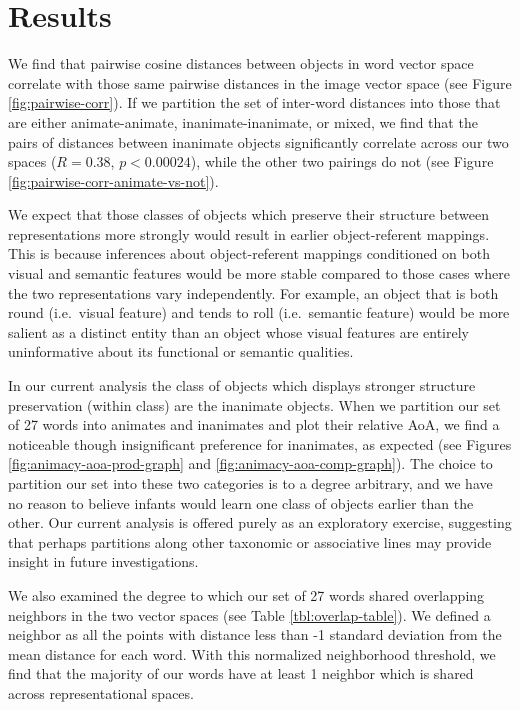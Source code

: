\documentclass[10pt, letterpaper]{article}
\begin{document}
\section{Results}\label{results}

We find that pairwise cosine distances between objects in word vector
space correlate with those same pairwise distances in the image vector
space (see Figure \ref{fig:pairwise-corr}). If we partition the set of
inter-word distances into those that are either animate-animate,
inanimate-inanimate, or mixed, we find that the pairs of distances
between inanimate objects significantly correlate across our two spaces
(\(R = 0.38\), \(p < 0.00024\)), while the other two pairings do not
(see Figure \ref{fig:pairwise-corr-animate-vs-not}).

We expect that those classes of objects which preserve their structure
between representations more strongly would result in earlier
object-referent mappings. This is because inferences about
object-referent mappings conditioned on both visual and semantic
features would be more stable compared to those cases where the two
representations vary independently. For example, an object that is both
round (i.e.~visual feature) and tends to roll (i.e.~semantic feature)
would be more salient as a distinct entity than an object whose visual
features are entirely uninformative about its functional or semantic
qualities.

In our current analysis the class of objects which displays stronger
structure preservation (within class) are the inanimate objects. When we
partition our set of 27 words into animates and inanimates and plot
their relative AoA, we find a noticeable though insignificant preference
for inanimates, as expected (see Figures
\ref{fig:animacy-aoa-prod-graph} and \ref{fig:animacy-aoa-comp-graph}).
The choice to partition our set into these two categories is to a degree
arbitrary, and we have no reason to believe infants would learn one
class of objects earlier than the other. Our current analysis is offered
purely as an exploratory exercise, suggesting that perhaps partitions
along other taxonomic or associative lines may provide insight in future
investigations.

We also examined the degree to which our set of 27 words shared
overlapping neighbors in the two vector spaces (see Table
\ref{tbl:overlap-table}). We defined a neighbor as all the points with
distance less than -1 standard deviation from the mean distance for each
word. With this normalized neighborhood threshold, we find that the
majority of our words have at least 1 neighbor which is shared across
representational spaces.
\end{document}
